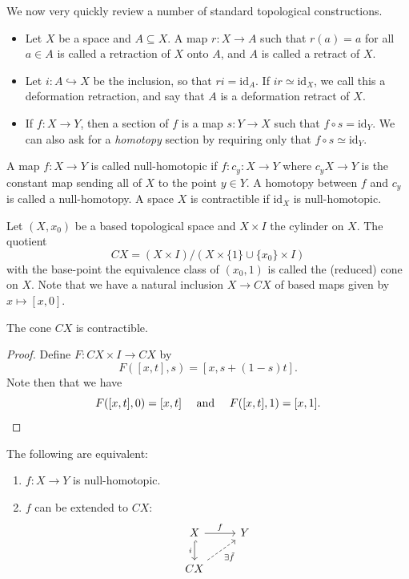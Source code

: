 \documentclass[ma3408.tex]{subfiles}
\begin{document}
\begin{Rem}
We now very quickly review a number of standard topological constructions. 
\begin{itemize}
	\item Let $X$ be a space and $A \subseteq X$. A map $r \colon X \to A$ such that $r(a) = a$ for all $a \in A$ is called a retraction of $X$ onto $A$, and $A$ is called a retract of $X$. 
	\item Let $i \colon A \hookrightarrow X$ be the inclusion, so that $ri = \text{id}_A$. If $ir \simeq \text{id}_X$, we call this a deformation retraction, and say that $A$ is a deformation retract of $X$. 
	\item If $f \colon X \to Y$, then a section of $f$ is a map $s \colon Y \to X$ such that $f \circ s = \text{id}_Y$. We can also ask for a \emph{homotopy} section by requiring only that $f \circ s \simeq \text{id}_Y$. 
\end{itemize}
\end{Rem}
\begin{Def}
A map $f \colon X \to Y$ is called null-homotopic if $f \colon c_y \colon X \to Y$ where $c_y X \to Y$ is the constant map sending all of $X$ to the point $y \in Y$. A homotopy between $f$ and $c_y$ is called a null-homotopy. A space $X$ is contractible if $\text{id}_X$ is null-homotopic. 
\end{Def}
\begin{Def}
Let $(X,x_0)$ be a based topological space and $X \times I$ the cylinder on $X$. The quotient
\[
CX = (X \times I)/(X \times \{ 1 \} \cup \{ x_0 \} \times I)
\]
with the base-point the equivalence class of $(x_0,1)$ is called the (reduced) cone on $X$. Note that we have a natural inclusion $X \to CX$ of based maps given by $x \mapsto [x,0]$. 
\end{Def}
\begin{Lem}\label{lem:cone_is_contractible}
The cone $CX$ is contractible. 
\end{Lem}
\begin{proof}
Define $F \colon CX \times I \to CX$ by
\[
F([x,t],s) = [x,s+(1-s)t]. 
\]
Note then that we have
\[
F([x,t],0) = [x,t] \quad \text{ and } \quad F([x,t],1) = [x,1]. \qedhere
\]

\end{proof}
\begin{Lem}
The following are equivalent:
\begin{enumerate}[label=(\roman*)]
	\item $f \colon X \to Y$ is null-homotopic. 
	\item $f$ can be extended to $CX$:
\[\begin{tikzcd}
	X & Y \\
	CX
	\arrow["f", from=1-1, to=1-2]
	\arrow["i"', hook, from=1-1, to=2-1]
	\arrow["{\exists \tilde f}"', dashed, from=2-1, to=1-2]
\end{tikzcd}\]
\end{enumerate}
\end{Lem}
\end{document}

